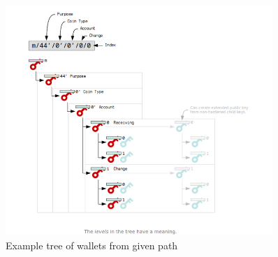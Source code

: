 \begin{figure}[ht!]
    \centering
    \includegraphics[width=0.9\textwidth]{images/bip44.png}
    \caption[Example tree of wallets from given path]{Example tree of wallets from given path \cite{learnme}}
    \label{fig:bip44}
\end{figure}

